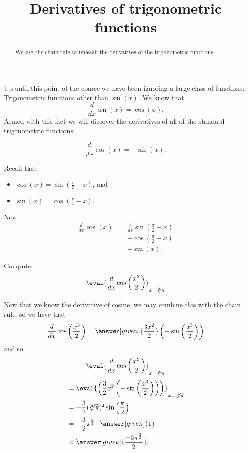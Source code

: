 \documentclass{ximera}
\title[Dig-In:]{Derivatives of trigonometric functions}
\begin{document}
\begin{abstract}
  We use the chain rule to unleash the derivatives of the
  trigonometric functions.
\end{abstract}
\maketitle

Up until this point of the course we have been ignoring a large class
of functions: Trigonometric functions other than $\sin(x)$. We know
that
\[
\frac{d}{dx} \sin(x) = \cos(x).
\]
Armed with this fact we will discover the derivatives of all of the
standard trigonometric functions.

\begin{theorem}
\[
\frac{d}{dx} \cos(x) = -\sin(x).
\]
\begin{explanation}
Recall that
\begin{itemize}
\item $\cos(x) = \sin\left(\frac{\pi}{2}-x\right)$, and
\item $\sin(x) = \cos\left(\frac{\pi}{2}-x\right)$.
\end{itemize}
Now
\begin{align*}
\frac{d}{dx} \cos(x) &= \frac{d}{dx} \sin\left(\frac{\pi}{2}-x\right)\\
&=-\cos\left(\frac{\pi}{2}-x\right) \\
&= -\sin(x).
\end{align*}
\end{explanation}
\end{theorem}

\begin{example}
Compute:
\[
\eval{\frac{d}{dx} \cos \left( \frac{x^3}{2} \right)}_{x=\sqrt[3]{\pi}}
\]
\begin{explanation}
Now that we know the derivative of cosine, we may combine this with the
chain rule, so we have that
\[
\frac{d}{dx} \cos \left( \frac{x^3}{2} \right) = \answer[given]{\frac{3 x^2}{2}} \left(- \sin \left( \frac{x^3}{2} \right) \right)
\]
and so
\[
\eval{\frac{d}{dx} \cos \left( \frac{x^3}{2} \right)}_{x=\sqrt[3]{\pi}}
\]
\begin{align*}
  &= \eval{\left( \frac{3}{2} x^2 \left(- \sin \left( \frac{x^3}{2}
    \right) \right) \right)}_{x=\sqrt[3]{\pi}} \\
  &= - \frac{3}{2}(\sqrt[3]{\pi})^2 \sin \left( \frac{\pi}{2} \right) \\
  &= -\frac{3}{2} \pi^{\frac{2}{3}} \cdot \answer[given]{1} \\
  &=\answer[given]{\frac{-3 \pi^{\frac{2}{3}}}{2}}.
\end{align*}
\end{explanation}
\end{example}
\end{document}
